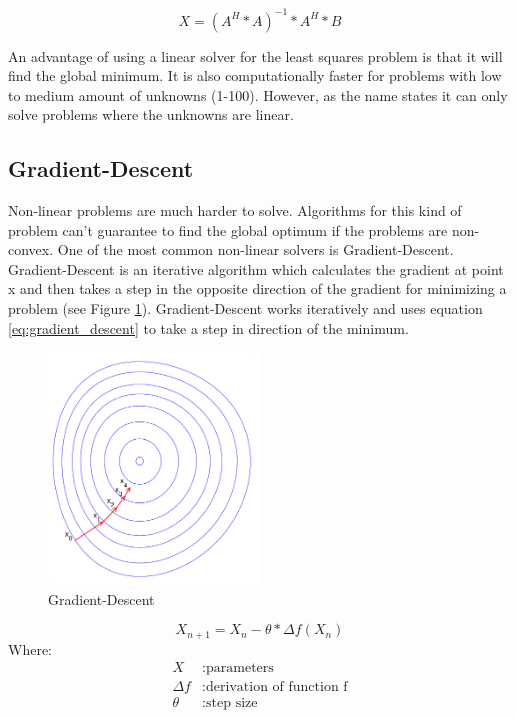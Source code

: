 \documentclass[11pt,a4paper,titlepage,oneside]{report}
\begin{document}
\begin{equation}\label{eq:least_squares_algorithm}
  X=(A^H*A)^{-1}*A^H*B 
\end{equation}

An advantage of using a linear solver for the least squares problem is that it will find the global minimum. It is also computationally faster for problems with low to medium amount of unknowns (1-100). However, as the name states it can only solve problems where the unknowns are linear.

\subsection{Gradient-Descent}

Non-linear problems are much harder to solve. Algorithms for this kind of problem can't guarantee to find the global optimum if the problems are non-convex. One of the most common non-linear solvers is Gradient-Descent. Gradient-Descent is an iterative algorithm which calculates the gradient at point x and then takes a step in the opposite direction of the gradient for minimizing a problem (see Figure \ref{fig:gradient_descent}). Gradient-Descent works iteratively and uses equation \ref{eq:gradient_descent} to take a step in direction of the minimum.

\begin{figure}[H]
  \begin{center}
    \includegraphics[width=0.5\textwidth]{img/gradient_descent.png}
  \end{center}
    \caption{Gradient-Descent}\label{fig:gradient_descent}
\end{figure}

\begin{equation}\label{eq:gradient_descent}
  X_{n+1}=X_n-\theta*\Delta f(X_n)
\end{equation}
Where:
\begin{align*}
  X		      &: \text{parameters}\\
  \Delta f  &: \text{derivation of function f}\\
  \theta    &: \text{step size}
\end{align*}
\end{document}
